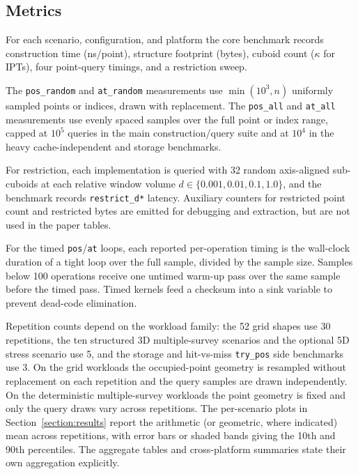 \documentclass[manuscript,screen,review]{acmart}
\theoremstyle{definition}
\theoremstyle{plain}
\begin{document}
\subsection{Metrics}
\label{section:metrics}

For each scenario, configuration, and platform the core benchmark records
construction time (ns/point), structure footprint (bytes), cuboid count
($\kappa$ for IPTs), four point-query timings, and a restriction sweep.

The \texttt{pos\_random} and \texttt{at\_random} measurements use
$\min(10^3, n)$ uniformly sampled points or indices, drawn with
replacement.
The \texttt{pos\_all} and \texttt{at\_all} measurements use evenly
spaced samples over the full point or index range, capped at $10^5$
queries in the main construction/query suite and at $10^4$ in the heavy
cache-independent and storage benchmarks.

For restriction, each implementation is queried with 32 random
axis-aligned sub-cuboids at each relative window volume
$d \in \{0.001, 0.01, 0.1, 1.0\}$, and the benchmark records
\texttt{restrict\_d*} latency. Auxiliary counters for restricted point
count and restricted bytes are emitted for debugging and extraction,
but are not used in the paper tables.

For the timed \texttt{pos}/\texttt{at} loops, each reported per-operation
timing is the wall-clock duration of a tight loop over the full sample,
divided by the sample size.
Samples below 100 operations receive one untimed warm-up pass over the
same sample before the timed pass.
Timed kernels feed a checksum into a sink variable to prevent dead-code
elimination.

Repetition counts depend on the workload family: the 52 grid shapes use
30 repetitions, the ten structured 3D multiple-survey scenarios and the
optional 5D stress scenario use 5, and the storage and hit-vs-miss
\texttt{try\_pos} side benchmarks use 3.
On the grid workloads the occupied-point geometry is resampled without
replacement on each repetition and the query samples are drawn
independently. On the deterministic multiple-survey workloads the point
geometry is fixed and only the query draws vary across repetitions.
The per-scenario plots in Section~\ref{section:results} report the
arithmetic (or geometric, where indicated) mean across repetitions, with
error bars or shaded bands giving the 10th and 90th percentiles.
The aggregate tables and cross-platform summaries state their own
aggregation explicitly.
\end{document}
